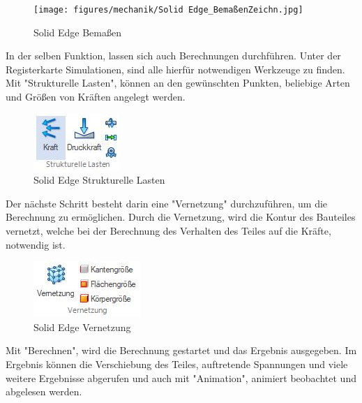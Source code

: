 \begin{figure} [H]
	\begin{center}
		\texttt{[image: figures/mechanik/Solid Edge\_BemaßenZeichn.jpg]}
			\caption{Solid Edge Bemaßen}
			\label{fig:Solid Edge Bemaßen}
	\end{center}
\end{figure}


In der selben Funktion, lassen sich auch Berechnungen durchführen.
Unter der Registerkarte Simulationen, sind alle hierfür notwendigen Werkzeuge zu finden.
Mit "Strukturelle Lasten", können an den gewünschten Punkten, beliebige Arten und Größen von Kräften angelegt werden. 


\begin{figure} [H]
	\begin{center}
		\includegraphics[scale=0.4]{figures/mechanik/Solid Edge_Strukturelle Lasten.jpg}
			\caption{Solid Edge Strukturelle Lasten}
			\label{fig:Solid Edge Strukturelle Lasten}
	\end{center}
\end{figure}


Der nächste Schritt besteht darin eine "Vernetzung" durchzuführen, um die Berechnung zu ermöglichen. Durch die Vernetzung, wird die Kontur des Bauteiles vernetzt, welche bei der Berechnung des Verhalten des Teiles auf die Kräfte, notwendig ist. 


\begin{figure} [H]
	\begin{center}
		\includegraphics[scale=0.4]{figures/mechanik/Solid Edge_Vernetzung.jpg}
			\caption{Solid Edge Vernetzung}
			\label{fig:Solid Edge Vernetzung}
	\end{center}
\end{figure}


Mit "Berechnen", wird die Berechnung gestartet und das Ergebnis ausgegeben.
Im Ergebnis können die Verschiebung des Teiles, auftretende Spannungen und viele weitere Ergebnisse abgerufen und auch mit "Animation", animiert beobachtet und abgelesen werden. 


